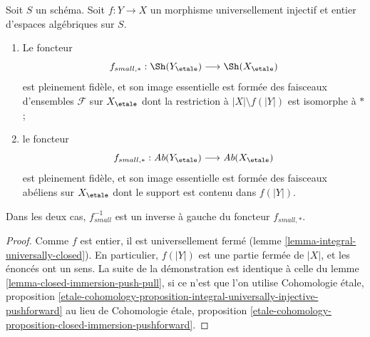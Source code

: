 \begin{lemma}
\label{lemma-integral-universally-injective-push-pull}
Soit $S$ un schéma. Soit $f : Y \to X$ un morphisme universellement injectif
et entier d'espaces algébriques sur $S$.
\begin{enumerate}
\item Le foncteur
$$
f_{small, *} : \Sh(Y_\etale) \longrightarrow \Sh(X_\etale)
$$
est pleinement fidèle, et son image essentielle est formée des faisceaux d'ensembles
$\mathcal{F}$ sur $X_\etale$ dont la restriction à $|X| \setminus f(|Y|)$
est isomorphe à $*$ ;
\item le foncteur
$$
f_{small, *} : \textit{Ab}(Y_\etale) \longrightarrow \textit{Ab}(X_\etale)
$$
est pleinement fidèle, et son image essentielle est formée des faisceaux abéliens sur
$X_\etale$ dont le support est contenu dans $f(|Y|)$.
\end{enumerate}
Dans les deux cas, $f_{small}^{-1}$ est un inverse à gauche du foncteur $f_{small, *}$.
\end{lemma}

\begin{proof}
Comme $f$ est entier, il est universellement fermé
(lemme \ref{lemma-integral-universally-closed}).
En particulier, $f(|Y|)$ est une partie fermée de $|X|$,
et les énoncés ont un sens.
La suite de la démonstration est identique à celle du
lemme \ref{lemma-closed-immersion-push-pull},
si ce n'est que l'on utilise
Cohomologie étale, proposition
\ref{etale-cohomology-proposition-integral-universally-injective-pushforward}
au lieu de
Cohomologie étale, proposition
\ref{etale-cohomology-proposition-closed-immersion-pushforward}.
\end{proof}





























